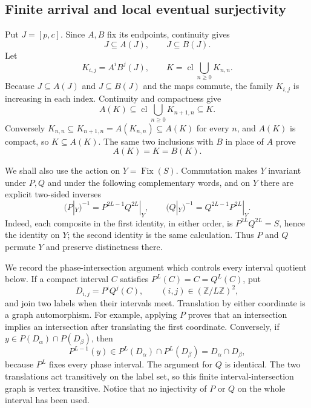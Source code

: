 \documentclass[11pt]{article}
\theoremstyle{definition}
\theoremstyle{remark}
\newcommand{\Fix}{\operatorname{Fix}}
\newcommand{\cl}{\operatorname{cl}}
\begin{document}
\subsection{Finite arrival and local eventual surjectivity}

Put \(J=[p,c]\).  Since \(A,B\) fix its endpoints, continuity gives
\begin{equation}\label{eq:pl-J-expands}
 J\subseteq A(J),\qquad J\subseteq B(J).
\end{equation}
Let
\[
 K_{i,j}=A^iB^j(J),\qquad
 K=\cl\bigcup_{n\geq0}K_{n,n}.
\]
Because $J\subseteq A(J)$ and $J\subseteq B(J)$ and the maps commute, the
family $K_{i,j}$ is increasing in each index.  Continuity and compactness
give
\[
 A(K)\subseteq\cl\bigcup_{n\geq0}K_{n+1,n}\subseteq K.
\]
Conversely $K_{n,n}\subseteq K_{n+1,n}=A(K_{n,n})\subseteq A(K)$ for every
$n$, and $A(K)$ is compact, so $K\subseteq A(K)$.  The same two inclusions
with $B$ in place of $A$ prove
\begin{equation}\label{eq:pl-K-invariant}
 A(K)=K=B(K).
\end{equation}

We shall also use the action on $Y=\Fix(S)$.  Commutation makes $Y$
invariant under $P,Q$ and under the following complementary words, and on
$Y$ there are explicit two-sided inverses
\begin{equation}\label{eq:pl-S-inverses}
 (P|_Y)^{-1}=P^{2L-1}Q^{2L}|_Y,\qquad
 (Q|_Y)^{-1}=Q^{2L-1}P^{2L}|_Y.
\end{equation}
Indeed, each composite in the first identity, in either order, is
$P^{2L}Q^{2L}=S$, hence the identity on $Y$; the second identity is the
same calculation.  Thus $P$ and $Q$ permute $Y$ and preserve distinctness
there.

We record the phase-intersection argument which controls every interval
quotient below.  If a compact interval \(C\) satisfies
\(P^L(C)=C=Q^L(C)\), put
\[
 D_{i,j}=P^iQ^j(C),\qquad
 (i,j)\in(\mathbb Z/L\mathbb Z)^2,
\]
and join two labels when their intervals meet.  Translation by either
coordinate is a graph automorphism.  For example, applying \(P\) proves
that an intersection implies an intersection after translating the first
coordinate.  Conversely, if
\(y\in P(D_\alpha)\cap P(D_\beta)\), then
\[
 P^{L-1}(y)\in P^L(D_\alpha)\cap P^L(D_\beta)
 =D_\alpha\cap D_\beta,
\]
because \(P^L\) fixes every phase interval.  The argument for \(Q\) is
identical.  The two translations act transitively on the label set, so this
finite interval-intersection graph is vertex transitive.  Notice that no
injectivity of \(P\) or \(Q\) on the whole interval has been used.
\end{document}
